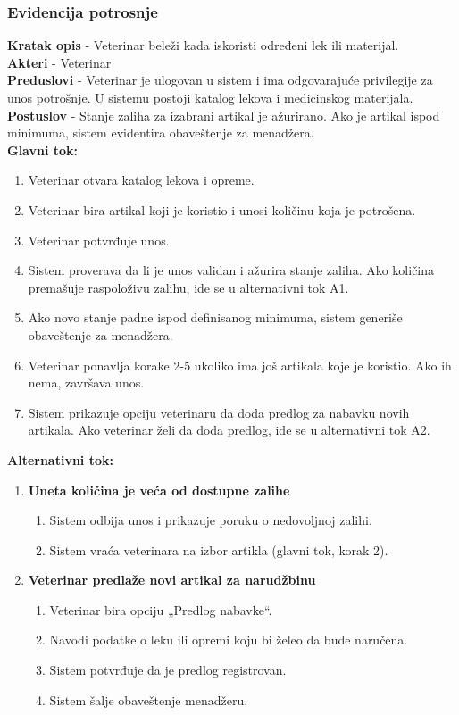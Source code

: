 \subsubsection{Evidencija potrosnje}
\indent \textbf{Kratak opis} - Veterinar beleži kada iskoristi određeni lek ili materijal.\\
\indent \textbf{Akteri} - Veterinar\\
\indent \textbf{Preduslovi} - Veterinar je ulogovan u sistem i ima odgovarajuće privilegije za unos potrošnje. U sistemu postoji katalog lekova i medicinskog materijala.
\indent \textbf{Postuslov} - Stanje zaliha za izabrani artikal je ažurirano. Ako je artikal ispod minimuma, sistem evidentira obaveštenje za menadžera. \\
\indent \textbf{Glavni tok:}
\begin{enumerate}
    \item Veterinar otvara katalog lekova i opreme. 
    \item Veterinar bira artikal koji je koristio i unosi količinu koja je potrošena. 
    \item Veterinar potvrđuje unos. 
    \item Sistem proverava da li je unos validan i ažurira stanje zaliha. Ako količina premašuje raspoloživu zalihu, ide se u alternativni tok A1. 
    \item Ako novo stanje padne ispod definisanog minimuma, sistem generiše obaveštenje za menadžera.
    \item Veterinar ponavlja korake 2-5 ukoliko ima još artikala koje je koristio. Ako ih nema, završava unos.
    \item Sistem prikazuje opciju veterinaru da doda predlog za nabavku novih artikala.
    Ako veterinar želi da doda predlog, ide se u alternativni tok A2.
\end{enumerate}
\indent \textbf{Alternativni tok:}
\begin{enumerate}
    \item[A1.]\textbf{Uneta količina je veća od dostupne zalihe} 
    \begin{enumerate}
        \item[1.] Sistem odbija unos i prikazuje poruku o nedovoljnoj zalihi.
        \item[2.] Sistem vraća veterinara na izbor artikla (glavni tok, korak 2).
    \end{enumerate}
    \item[A2.]\textbf{Veterinar predlaže novi artikal za narudžbinu} 
        \begin{enumerate}
            \item[1.] Veterinar bira opciju „Predlog nabavke“.
            \item[2.] Navodi podatke o leku ili opremi koju bi želeo da bude naručena.
            \item[3.] Sistem potvrđuje da je predlog registrovan.
            \item[4.] Sistem šalje obaveštenje menadžeru.
        \end{enumerate}
\end{enumerate}

